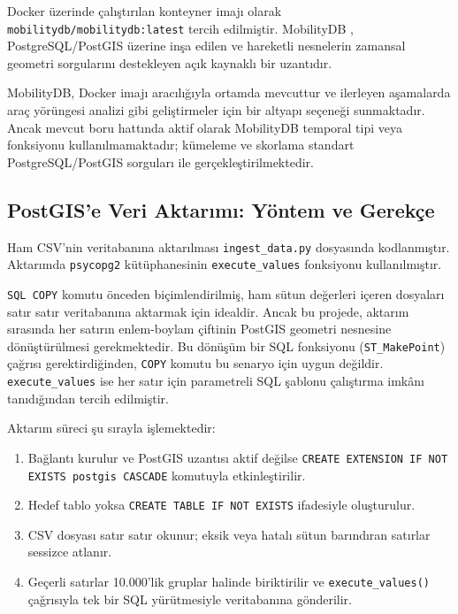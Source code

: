 \documentclass[12pt,a4paper]{article}
\begin{document}
Docker üzerinde çalıştırılan konteyner imajı olarak \texttt{mobilitydb/mobilitydb:latest} tercih edilmiştir. MobilityDB \cite{mobilitydb}, PostgreSQL/PostGIS üzerine inşa edilen ve hareketli nesnelerin zamansal geometri sorgularını destekleyen açık kaynaklı bir uzantıdır.

\begin{notebox}
MobilityDB, Docker imajı aracılığıyla ortamda mevcuttur ve ilerleyen aşamalarda araç yörüngesi analizi gibi geliştirmeler için bir altyapı seçeneği sunmaktadır. Ancak mevcut boru hattında aktif olarak MobilityDB temporal tipi veya fonksiyonu kullanılmamaktadır; kümeleme ve skorlama standart PostgreSQL/PostGIS sorguları ile gerçekleştirilmektedir.
\end{notebox}

\subsection{PostGIS'e Veri Aktarımı: Yöntem ve Gerekçe}

Ham CSV'nin veritabanına aktarılması \texttt{ingest\_data.py} dosyasında kodlanmıştır. Aktarımda \texttt{psycopg2} kütüphanesinin \texttt{execute\_values} fonksiyonu kullanılmıştır.

\begin{notebox}
\texttt{SQL COPY} komutu önceden biçimlendirilmiş, ham sütun değerleri içeren dosyaları satır satır veritabanına aktarmak için idealdir. Ancak bu projede, aktarım sırasında her satırın enlem-boylam çiftinin PostGIS geometri nesnesine dönüştürülmesi gerekmektedir. Bu dönüşüm bir SQL fonksiyonu (\texttt{ST\_MakePoint}) çağrısı gerektirdiğinden, \texttt{COPY} komutu bu senaryo için uygun değildir. \texttt{execute\_values} ise her satır için parametreli SQL şablonu çalıştırma imkânı tanıdığından tercih edilmiştir.
\end{notebox}

Aktarım süreci şu sırayla işlemektedir:

\begin{enumerate}
    \item Bağlantı kurulur ve PostGIS uzantısı aktif değilse \texttt{CREATE EXTENSION IF NOT EXISTS postgis CASCADE} komutuyla etkinleştirilir.
    \item Hedef tablo yoksa \texttt{CREATE TABLE IF NOT EXISTS} ifadesiyle oluşturulur.
    \item CSV dosyası satır satır okunur; eksik veya hatalı sütun barındıran satırlar sessizce atlanır.
    \item Geçerli satırlar 10.000'lik gruplar halinde biriktirilir ve \texttt{execute\_values()} çağrısıyla tek bir SQL yürütmesiyle veritabanına gönderilir.
\end{enumerate}
\end{document}
